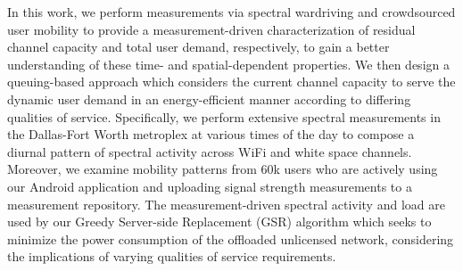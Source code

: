 In this work, we perform measurements via spectral wardriving and crowdsourced user 
mobility to provide a measurement-driven characterization of residual channel capacity
and total user demand, respectively, to gain a better understanding of these time- and
spatial-dependent properties.  We then design a queuing-based approach which 
considers the current channel capacity to serve the dynamic user demand in an energy-efficient 
manner according to differing qualities of service.  Specifically, we perform extensive
spectral measurements in the Dallas-Fort Worth metroplex at various times of the day
to compose a diurnal pattern of spectral activity across WiFi and white space channels.
Moreover, we examine mobility patterns from 60k users who are actively using our Android 
application and uploading signal strength measurements to a measurement repository. The
measurement-driven spectral activity and load are used by our Greedy Server-side Replacement (GSR)
algorithm which seeks to minimize the power consumption of the offloaded unlicensed network,
considering the implications of varying qualities of service requirements.

